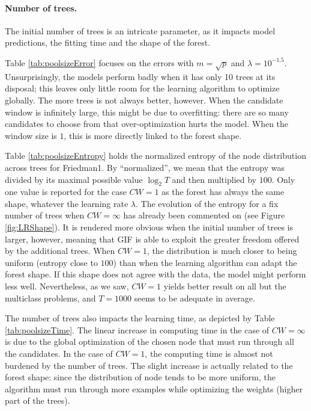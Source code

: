 \documentclass{article}
\begin{document}
\paragraph{Number of trees.}
The initial number of trees is an intricate parameter, as it impacts model
predictions, the fitting time and the shape of the forest.

Table \ref{tab:poolsizeError} focuses on the errors with $m=\sqrt{p}$ and 
$\lambda=10^{-1.5}$. Unsurprisingly, the models perform badly when it has only 
10 trees at its disposal; this leaves only little room for the learning 
algorithm to optimize globally. The more trees is not always better, however. 
When the candidate window is infinitely large, this might be due to 
overfitting: there are so many candidates to choose from that over-optimization 
hurts the model. When the window size is $1$, this is more directly linked to 
the forest shape.

Table \ref{tab:poolsizeEntropy} holds the normalized entropy of the node
distribution across trees for Friedman1.  By ``normalized'', we mean that the
entropy was divided by its maximal possible value $\log_2 T$ and then
multiplied by $100$.  Only one value is reported for the case $CW=1$ as the
forest has always the same shape, whatever the learning rate $\lambda$. The
evolution of the entropy for a fix number of trees when $CW=\infty$ has already
been commented on (see Figure \ref{fig:LRShape}).  It is rendered more
obvious when the initial number of trees is larger, however, meaning that GIF
is able to exploit the greater freedom offered by the additional trees.  When
$CW=1$, the distribution is much closer to being uniform (entropy close to
$100$) than when the learning algorithm can adapt the forest shape.  If this
shape does not agree with the data, the model might perform less well.
Nevertheless, as we saw, $CW=1$ yields better result on all but the multiclass
problems, and $T=1000$ seems to be adequate in average. %

The number of trees also impacts the learning time, as depicted by Table 
\ref{tab:poolsizeTime}. The linear increase in computing time in the case of 
$CW=\infty$ is due to the global optimization of the chosen node that must run 
through all the candidates. In the case of $CW=1$, the computing time is 
almost not burdened by the number of trees. The slight increase is actually 
related to the forest shape: since the distribution of node tends to be more 
uniform, the algorithm must run through more examples while optimizing the 
weights (higher part of the trees).
\end{document}
